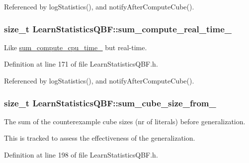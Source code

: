 Referenced by log\-Statistics(), and notify\-After\-Compute\-Cube().

\hypertarget{classLearnStatisticsQBF_aceb8e32bfd42839f2c19d3b12e7eb888}{
\subsubsection[{sum\-\_\-compute\-\_\-real\-\_\-time\-\_\-}]{\setlength{\rightskip}{0pt plus 5cm}size\-\_\-t Learn\-Statistics\-Q\-B\-F\-::sum\-\_\-compute\-\_\-real\-\_\-time\-\_\-\hspace{0.3cm}{\ttfamily [protected]}}}\label{classLearnStatisticsQBF_aceb8e32bfd42839f2c19d3b12e7eb888}


Like \hyperlink{classLearnStatisticsQBF_a4caf75f422eed77570e5592ce35c9bd0}{sum\-\_\-compute\-\_\-cpu\-\_\-time\-\_\-} but real-\/time. 



Definition at line 171 of file Learn\-Statistics\-Q\-B\-F.\-h.



Referenced by log\-Statistics(), and notify\-After\-Compute\-Cube().

\hypertarget{classLearnStatisticsQBF_a46277893a5465fb97805624e1ac31f38}{
\subsubsection[{sum\-\_\-cube\-\_\-size\-\_\-from\-\_\-}]{\setlength{\rightskip}{0pt plus 5cm}size\-\_\-t Learn\-Statistics\-Q\-B\-F\-::sum\-\_\-cube\-\_\-size\-\_\-from\-\_\-\hspace{0.3cm}{\ttfamily [protected]}}}\label{classLearnStatisticsQBF_a46277893a5465fb97805624e1ac31f38}


The sum of the counterexample cube sizes (nr of literals) before generalization. 

This is tracked to assess the effectiveness of the generalization. 

Definition at line 198 of file Learn\-Statistics\-Q\-B\-F.\-h.



